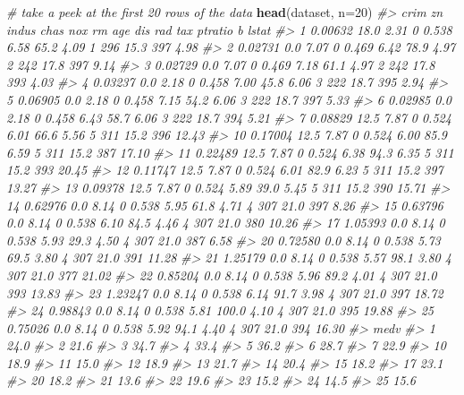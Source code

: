 \documentclass[]{book}
\newenvironment{Shaded}{\begin{snugshade}}{\end{snugshade}}
\newcommand{\CommentTok}[1]{\textcolor[rgb]{0.56,0.35,0.01}{\textit{#1}}}
\newcommand{\DataTypeTok}[1]{\textcolor[rgb]{0.13,0.29,0.53}{#1}}
\newcommand{\DecValTok}[1]{\textcolor[rgb]{0.00,0.00,0.81}{#1}}
\newcommand{\KeywordTok}[1]{\textcolor[rgb]{0.13,0.29,0.53}{\textbf{#1}}}
\newcommand{\NormalTok}[1]{#1}
\begin{document}
\begin{Shaded}
\begin{Highlighting}[]
\CommentTok{# take a peek at the first 20 rows of the data}
\KeywordTok{head}\NormalTok{(dataset, }\DataTypeTok{n=}\DecValTok{20}\NormalTok{)}
\CommentTok{#>       crim   zn indus chas   nox   rm   age  dis rad tax ptratio   b lstat}
\CommentTok{#> 1  0.00632 18.0  2.31    0 0.538 6.58  65.2 4.09   1 296    15.3 397  4.98}
\CommentTok{#> 2  0.02731  0.0  7.07    0 0.469 6.42  78.9 4.97   2 242    17.8 397  9.14}
\CommentTok{#> 3  0.02729  0.0  7.07    0 0.469 7.18  61.1 4.97   2 242    17.8 393  4.03}
\CommentTok{#> 4  0.03237  0.0  2.18    0 0.458 7.00  45.8 6.06   3 222    18.7 395  2.94}
\CommentTok{#> 5  0.06905  0.0  2.18    0 0.458 7.15  54.2 6.06   3 222    18.7 397  5.33}
\CommentTok{#> 6  0.02985  0.0  2.18    0 0.458 6.43  58.7 6.06   3 222    18.7 394  5.21}
\CommentTok{#> 7  0.08829 12.5  7.87    0 0.524 6.01  66.6 5.56   5 311    15.2 396 12.43}
\CommentTok{#> 10 0.17004 12.5  7.87    0 0.524 6.00  85.9 6.59   5 311    15.2 387 17.10}
\CommentTok{#> 11 0.22489 12.5  7.87    0 0.524 6.38  94.3 6.35   5 311    15.2 393 20.45}
\CommentTok{#> 12 0.11747 12.5  7.87    0 0.524 6.01  82.9 6.23   5 311    15.2 397 13.27}
\CommentTok{#> 13 0.09378 12.5  7.87    0 0.524 5.89  39.0 5.45   5 311    15.2 390 15.71}
\CommentTok{#> 14 0.62976  0.0  8.14    0 0.538 5.95  61.8 4.71   4 307    21.0 397  8.26}
\CommentTok{#> 15 0.63796  0.0  8.14    0 0.538 6.10  84.5 4.46   4 307    21.0 380 10.26}
\CommentTok{#> 17 1.05393  0.0  8.14    0 0.538 5.93  29.3 4.50   4 307    21.0 387  6.58}
\CommentTok{#> 20 0.72580  0.0  8.14    0 0.538 5.73  69.5 3.80   4 307    21.0 391 11.28}
\CommentTok{#> 21 1.25179  0.0  8.14    0 0.538 5.57  98.1 3.80   4 307    21.0 377 21.02}
\CommentTok{#> 22 0.85204  0.0  8.14    0 0.538 5.96  89.2 4.01   4 307    21.0 393 13.83}
\CommentTok{#> 23 1.23247  0.0  8.14    0 0.538 6.14  91.7 3.98   4 307    21.0 397 18.72}
\CommentTok{#> 24 0.98843  0.0  8.14    0 0.538 5.81 100.0 4.10   4 307    21.0 395 19.88}
\CommentTok{#> 25 0.75026  0.0  8.14    0 0.538 5.92  94.1 4.40   4 307    21.0 394 16.30}
\CommentTok{#>    medv}
\CommentTok{#> 1  24.0}
\CommentTok{#> 2  21.6}
\CommentTok{#> 3  34.7}
\CommentTok{#> 4  33.4}
\CommentTok{#> 5  36.2}
\CommentTok{#> 6  28.7}
\CommentTok{#> 7  22.9}
\CommentTok{#> 10 18.9}
\CommentTok{#> 11 15.0}
\CommentTok{#> 12 18.9}
\CommentTok{#> 13 21.7}
\CommentTok{#> 14 20.4}
\CommentTok{#> 15 18.2}
\CommentTok{#> 17 23.1}
\CommentTok{#> 20 18.2}
\CommentTok{#> 21 13.6}
\CommentTok{#> 22 19.6}
\CommentTok{#> 23 15.2}
\CommentTok{#> 24 14.5}
\CommentTok{#> 25 15.6}
\end{Highlighting}
\end{Shaded}
\end{document}
